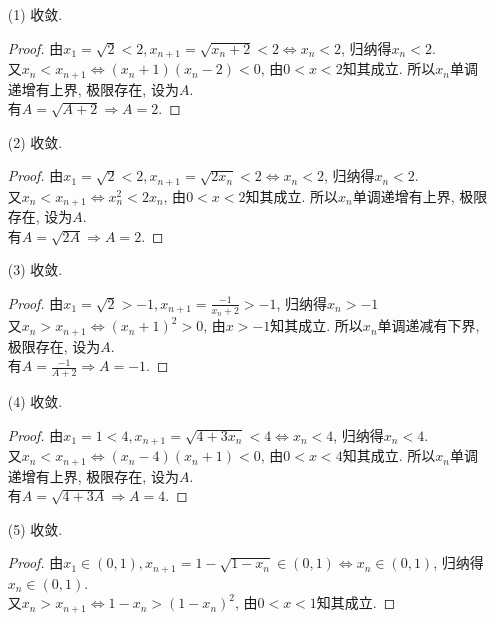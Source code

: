 \documentclass{article}
\begin{document}
\begin{itemize}
    \item[(1)]
    收敛.
    \begin{proof}
        由$x_1 = \sqrt{2} < 2, x_{n + 1} = \sqrt{x_n + 2} < 2 \Leftrightarrow x_n < 2 $, 归纳得$x_n < 2$. \\
        又$x_n < x_{n + 1} \Leftrightarrow (x_n + 1)(x_n - 2) < 0$, 由$0 < x < 2$知其成立.
        所以$x_n$单调递增有上界, 极限存在, 设为$A$. \\
        有$A = \sqrt{A + 2} \Rightarrow A = 2$.
    \end{proof}
    \item[(2)]
    收敛.
    \begin{proof}
        由$x_1 = \sqrt{2} < 2, x_{n + 1} = \sqrt{2x_n} < 2 \Leftrightarrow x_n < 2 $, 归纳得$x_n < 2$. \\
        又$x_n < x_{n + 1} \Leftrightarrow x_n^2 < 2x_n $, 由$0 < x < 2$知其成立.
        所以$x_n$单调递增有上界, 极限存在, 设为$A$. \\
        有$A = \sqrt{2A} \Rightarrow A = 2$.
    \end{proof}
    \item[(3)]
    收敛.
    \begin{proof}
        由$x_1 = \sqrt{2} > -1, x_{n + 1} = \frac{-1}{x_n + 2} > -1$, 归纳得$x_n > -1$ \\
        又$x_n > x_{n + 1} \Leftrightarrow (x_n + 1)^2 > 0 $, 由$x > -1$知其成立.
        所以$x_n$单调递减有下界, 极限存在, 设为$A$. \\
        有$A = \frac{-1}{A + 2} \Rightarrow A = -1$.
    \end{proof}
    \item[(4)]
    收敛.
    \begin{proof}
        由$x_1 = 1 < 4, x_{n + 1} = \sqrt{4 + 3x_n} < 4 \Leftrightarrow x_n < 4 $, 归纳得$x_n < 4$. \\
        又$x_n < x_{n + 1} \Leftrightarrow (x_n - 4)(x_n + 1) < 0 $, 由$0 < x < 4$知其成立.
        所以$x_n$单调递增有上界, 极限存在, 设为$A$. \\
        有$A = \sqrt{4 + 3A} \Rightarrow A = 4$.
    \end{proof}
    \item[(5)]
    收敛.
    \begin{proof}
        由$x_1 \in (0, 1), x_{n + 1} = 1 - \sqrt{1 - x_n} \in (0, 1) \Leftrightarrow x_n \in (0, 1) $, 归纳得$x_n \in (0, 1)$. \\
        又$x_n > x_{n + 1} \Leftrightarrow 1 - x_n > (1 - x_n)^2 $, 由$0 < x < 1$知其成立.

\end{proof}
\end{itemize}
\end{document}

